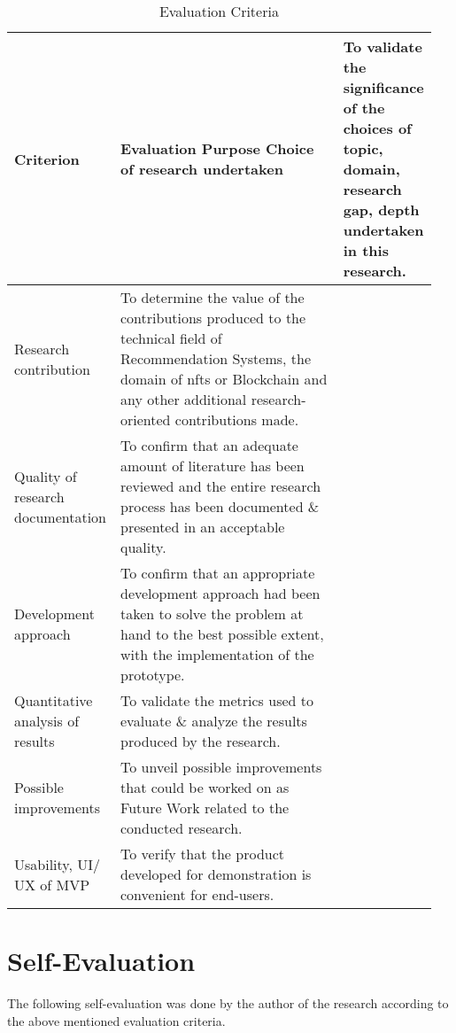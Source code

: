 \vspace{-4mm}
\begin{longtable}{|p{0.22\linewidth}|p{0.726\linewidth}|}
\caption{Evaluation Criteria}\\ 
\hline
\textbf{Criterion} & \textbf{Evaluation Purpose} \endfirsthead 
\hline
Choice of research undertaken & To validate the significance of the choices of topic, domain, research gap, depth undertaken in this research. \\ 
\hline
Research contribution & To determine the value of the contributions produced to the technical field of Recommendation Systems, the domain of \gls{nft}s or Blockchain and any other additional research-oriented contributions made. \\ 
\hline
Quality of research documentation & To confirm that an adequate amount of literature has been reviewed and the entire research process has been documented \& presented in an acceptable quality. \\ 
\hline
Development approach & To confirm that an appropriate development approach had been taken to solve the problem at hand to the best possible extent, with the implementation of the prototype.\\ 
\hline
Quantitative analysis of results & To validate the metrics used to evaluate \& analyze the results produced by the research. \\ 
\hline
Possible improvements & To unveil possible improvements that could be worked on as Future Work related to the conducted research. \\
\hline
Usability, UI/ UX of MVP &
To verify that the product developed for demonstration is convenient for end-users. \\
\hline
\end{longtable}

\section{Self-Evaluation}

The following self-evaluation was done by the author of the research according to the above mentioned evaluation criteria.

